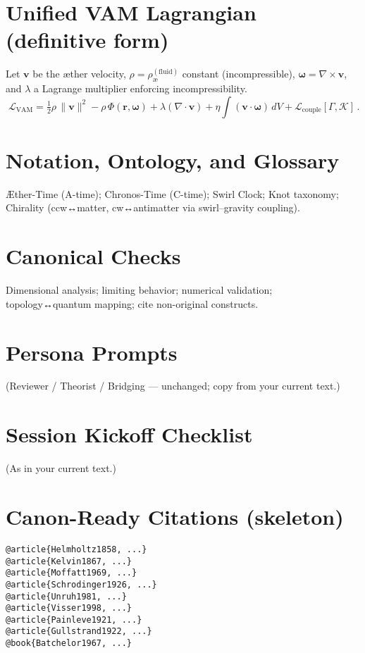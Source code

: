 \documentclass[11pt,a4paper]{article}
\begin{document}
    \section{Unified VAM Lagrangian (definitive form)}
    Let $\bm v$ be the æther velocity, $\rho=\rho_{\text{\ae}}^{(\text{fluid})}$ constant (incompressible), $\bm\omega=\nabla\times\bm v$, and $\lambda$ a Lagrange multiplier enforcing incompressibility.
    \[
        \boxed{\,\mathcal{L}_{\text{VAM}} =
            \tfrac{1}{2}\rho\,\lVert\bm v\rVert^{2}
            - \rho\,\Phi(\bm r,\bm\omega)
            + \lambda(\nabla\!\cdot\!\bm v)
            + \eta\!\int\!(\bm v\cdot\bm\omega)\,dV
            + \mathcal{L}_{\text{couple}}[\Gamma,\mathcal{K}]
            \,}.
    \]

    \section{Notation, Ontology, and Glossary}
    Æther-Time (A-time); Chronos-Time (C-time); Swirl Clock; Knot taxonomy; Chirality (ccw↔matter, cw↔antimatter via swirl–gravity coupling).

    \section{Canonical Checks}
    Dimensional analysis; limiting behavior; numerical validation; topology↔quantum mapping; cite non-original constructs.

    \section{Persona Prompts}
    (Reviewer / Theorist / Bridging — unchanged; copy from your current text.)

    \section{Session Kickoff Checklist}
    (As in your current text.)

    \section{Canon-Ready Citations (skeleton)}
    \begin{verbatim}
@article{Helmholtz1858, ...}
@article{Kelvin1867, ...}
@article{Moffatt1969, ...}
@article{Schrodinger1926, ...}
@article{Unruh1981, ...}
@article{Visser1998, ...}
@article{Painleve1921, ...}
@article{Gullstrand1922, ...}
@book{Batchelor1967, ...}
    \end{verbatim}
\end{document}
